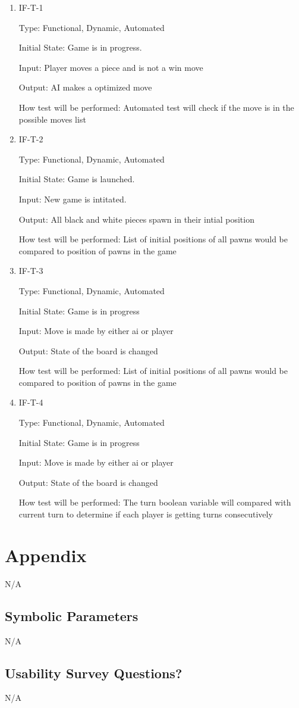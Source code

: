\documentclass[12pt, titlepage]{article}
\begin{document}
\begin{enumerate}
    \item{IF-T-1}

    Type: Functional, Dynamic, Automated

    Initial State: Game is in progress.

    Input: Player moves a piece and is not a win move
	
    Output: AI makes a optimized move
	
    How test will be performed: Automated test will check if the move is in the possible moves list
    
    \item{IF-T-2}

    Type: Functional, Dynamic, Automated

    Initial State: Game is launched.

    Input: New game is intitated.
	
    Output: All black and white pieces spawn in their intial position
	
    How test will be performed: List of initial positions of all pawns would be compared to position of pawns in the game
    
    \item{IF-T-3}

    Type: Functional, Dynamic, Automated

    Initial State: Game is in progress

    Input: Move is made by either ai or player
	
    Output: State of the board is changed
	
    How test will be performed: List of initial positions of all pawns would be compared to position of pawns in the game
    
    \item{IF-T-4}

    Type: Functional, Dynamic, Automated

    Initial State: Game is in progress

    Input: Move is made by either ai or player
	
    Output: State of the board is changed
	
    How test will be performed: The turn boolean variable will compared with current turn to determine if each player is getting turns consecutively
    
\end{enumerate}






\newpage

\section{Appendix}

N/A

\subsection{Symbolic Parameters}

N/A

\subsection{Usability Survey Questions?}

N/A
\end{document}
